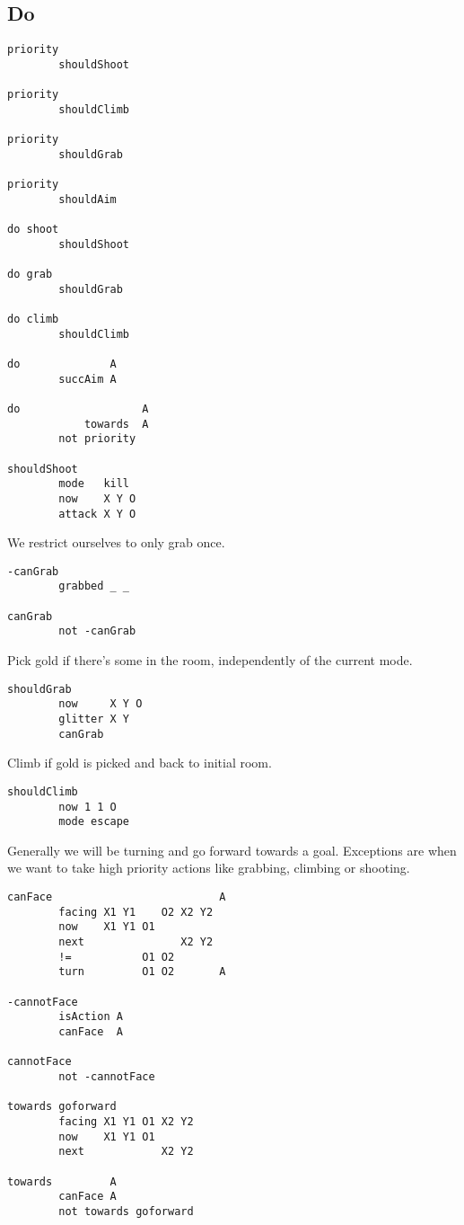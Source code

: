 \hypertarget{do}{%
\subsection{Do}\label{do}}

\begin{verbatim}
priority
        shouldShoot

priority
        shouldClimb

priority
        shouldGrab

priority
        shouldAim

do shoot
        shouldShoot

do grab
        shouldGrab

do climb
        shouldClimb

do              A
        succAim A

do                   A
            towards  A
        not priority

shouldShoot
        mode   kill
        now    X Y O
        attack X Y O
\end{verbatim}

We restrict ourselves to only grab once.

\begin{verbatim}
-canGrab
        grabbed _ _

canGrab
        not -canGrab
\end{verbatim}

Pick gold if there's some in the room, independently of the current
mode.

\begin{verbatim}
shouldGrab
        now     X Y O
        glitter X Y
        canGrab
\end{verbatim}

Climb if gold is picked and back to initial room.

\begin{verbatim}
shouldClimb
        now 1 1 O
        mode escape
\end{verbatim}

Generally we will be turning and go forward towards a goal. Exceptions
are when we want to take high priority actions like grabbing, climbing
or shooting.

\begin{verbatim}
canFace                          A
        facing X1 Y1    O2 X2 Y2
        now    X1 Y1 O1
        next               X2 Y2
        !=           O1 O2
        turn         O1 O2       A

-cannotFace
        isAction A
        canFace  A

cannotFace
        not -cannotFace

towards goforward
        facing X1 Y1 O1 X2 Y2
        now    X1 Y1 O1
        next            X2 Y2

towards         A
        canFace A
        not towards goforward
\end{verbatim}

